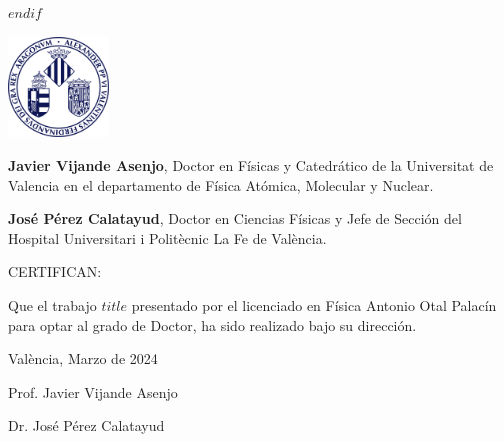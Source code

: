 \raggedright
$endif$


\newpage
\thispagestyle{empty}
\begin{flushright}
\end{flushright}


\includegraphics[width=0.2\textwidth]{logouni} %

\vspace{4ex}

\textbf{Javier Vijande Asenjo}, Doctor en Físicas y Catedrático de la Universitat de Valencia en el departamento de Física Atómica, Molecular y Nuclear.

\vspace{3ex}

\textbf{José Pérez Calatayud}, Doctor en Ciencias Físicas y Jefe de Sección del Hospital Universitari i Politècnic La Fe de València.

\vspace{3ex}

{\Large CERTIFICAN: }

\vspace{3ex}

Que el trabajo \textbf{$title$} presentado por el licenciado 
en Física Antonio Otal Palacín para optar al grado de Doctor, ha
sido realizado bajo su dirección.

\vspace{3ex}

València, Marzo de 2024

\vspace{25ex}

\begin{minipage}[t]{0.4\textwidth}
    \centering
    {\large Prof. Javier Vijande Asenjo \par}
\end{minipage}
\hfill
\begin{minipage}[t]{0.4\textwidth}
    \centering
    {\large Dr. José Pérez Calatayud \par}
\end{minipage}
\raggedright


